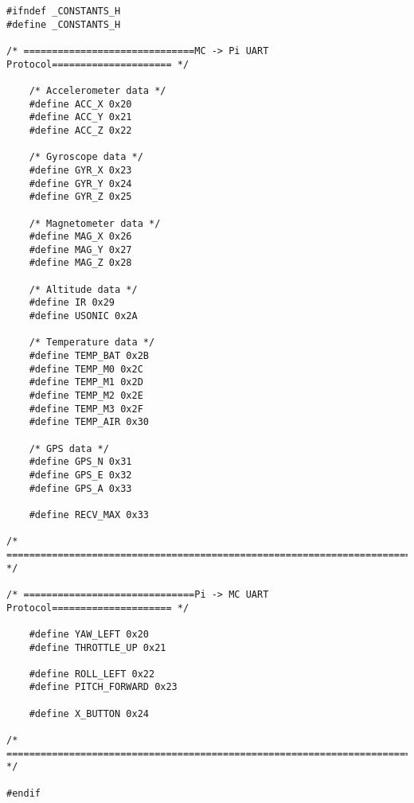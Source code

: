 \documentclass[a4paper,11pt]{article}
\begin{document}
\linespread{0.8}
\begin{lstlisting}
#ifndef _CONSTANTS_H
#define _CONSTANTS_H

/* ==============================MC -> Pi UART Protocol===================== */

    /* Accelerometer data */
    #define ACC_X 0x20
    #define ACC_Y 0x21
    #define ACC_Z 0x22

    /* Gyroscope data */
    #define GYR_X 0x23
    #define GYR_Y 0x24
    #define GYR_Z 0x25

    /* Magnetometer data */
    #define MAG_X 0x26
    #define MAG_Y 0x27
    #define MAG_Z 0x28

    /* Altitude data */
    #define IR 0x29
    #define USONIC 0x2A

    /* Temperature data */
    #define TEMP_BAT 0x2B
    #define TEMP_M0 0x2C
    #define TEMP_M1 0x2D
    #define TEMP_M2 0x2E
    #define TEMP_M3 0x2F
    #define TEMP_AIR 0x30

    /* GPS data */
    #define GPS_N 0x31
    #define GPS_E 0x32
    #define GPS_A 0x33
    
    #define RECV_MAX 0x33
    
/* ========================================================================== */

/* ==============================Pi -> MC UART Protocol===================== */

    #define YAW_LEFT 0x20
    #define THROTTLE_UP 0x21
    
    #define ROLL_LEFT 0x22
    #define PITCH_FORWARD 0x23

    #define X_BUTTON 0x24

/* ========================================================================== */

#endif
\end{lstlisting}
\end{document}
